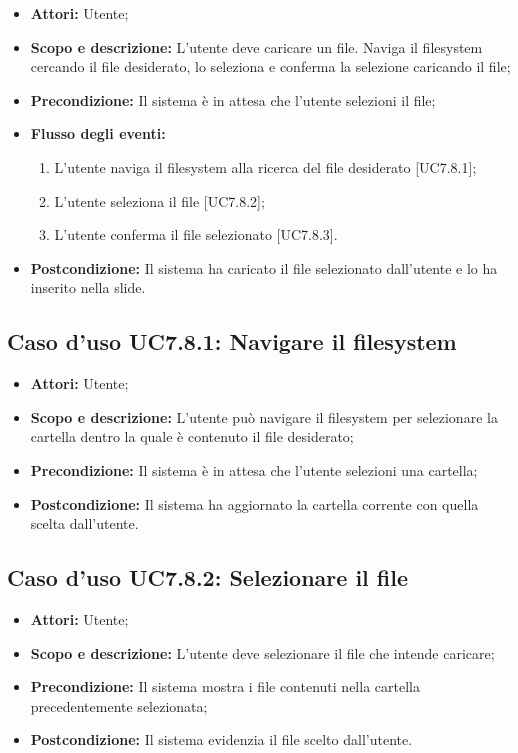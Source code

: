 \begin{itemize}
	\item \textbf{Attori:} Utente;
	\item \textbf{Scopo e descrizione:} L'utente deve caricare un file. Naviga il \gls{filesystem} cercando il file desiderato, lo seleziona e conferma la selezione caricando il file;
	\item \textbf{Precondizione:} Il sistema è in attesa che l'utente selezioni il file;
	\item \textbf{Flusso degli eventi:}
	\begin{enumerate}
		\item L'utente naviga il \gls{filesystem} alla ricerca del file desiderato [UC7.8.1];
		\item L'utente seleziona il file [UC7.8.2];
		\item L'utente conferma il file selezionato [UC7.8.3].
	\end{enumerate}
	\item \textbf{Postcondizione:} Il sistema ha caricato il file selezionato dall'utente e lo ha inserito nella slide.
\end{itemize}

\subsection{Caso d'uso UC7.8.1: Navigare il filesystem}
\begin{itemize}
	\item \textbf{Attori:} Utente;
	\item \textbf{Scopo e descrizione:} L'utente può navigare il \gls{filesystem} per selezionare la cartella dentro la quale è contenuto il file desiderato;
	\item \textbf{Precondizione:} Il sistema è in attesa che l'utente selezioni una cartella;
	\item \textbf{Postcondizione:} Il sistema ha aggiornato la cartella corrente con quella scelta dall'utente.
\end{itemize}

\subsection{Caso d'uso UC7.8.2: Selezionare il file}
\begin{itemize}
	\item \textbf{Attori:} Utente;
	\item \textbf{Scopo e descrizione:} L'utente deve selezionare il file che intende caricare;
	\item \textbf{Precondizione:} Il sistema mostra i file contenuti nella cartella precedentemente selezionata;
	\item \textbf{Postcondizione:} Il sistema evidenzia il file scelto dall'utente.
\end{itemize}

